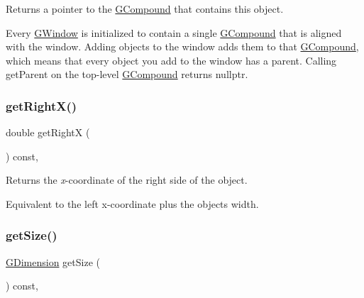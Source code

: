 Returns a pointer to the {\ttfamily \mbox{\hyperlink{classsgl_1_1GCompound}{G\+Compound}}} that contains this object. 

Every {\ttfamily \mbox{\hyperlink{classsgl_1_1GWindow}{G\+Window}}} is initialized to contain a single {\ttfamily \mbox{\hyperlink{classsgl_1_1GCompound}{G\+Compound}}} that is aligned with the window. Adding objects to the window adds them to that {\ttfamily \mbox{\hyperlink{classsgl_1_1GCompound}{G\+Compound}}}, which means that every object you add to the window has a parent. Calling {\ttfamily get\+Parent} on the top-\/level {\ttfamily \mbox{\hyperlink{classsgl_1_1GCompound}{G\+Compound}}} returns {\ttfamily nullptr}. \mbox{\label{classsgl_1_1GObject_a798cc79daaa10145b28f60bcdfdb0ee9}} 
\subsubsection{\texorpdfstring{get\+Right\+X()}{getRightX()}}
{\footnotesize\ttfamily double get\+RightX (\begin{DoxyParamCaption}{ }\end{DoxyParamCaption}) const\hspace{0.3cm}{\ttfamily [virtual]}, {\ttfamily [inherited]}}



Returns the {\itshape x}-\/coordinate of the right side of the object. 

Equivalent to the left x-\/coordinate plus the object\textquotesingle{}s width. \mbox{\label{classsgl_1_1GObject_a7b4eec96a2bdc6420695d5796a78eea9}} 
\subsubsection{\texorpdfstring{get\+Size()}{getSize()}}
{\footnotesize\ttfamily \mbox{\hyperlink{structsgl_1_1GDimension}{G\+Dimension}} get\+Size (\begin{DoxyParamCaption}{ }\end{DoxyParamCaption}) const\hspace{0.3cm}{\ttfamily [virtual]}, {\ttfamily [inherited]}}



